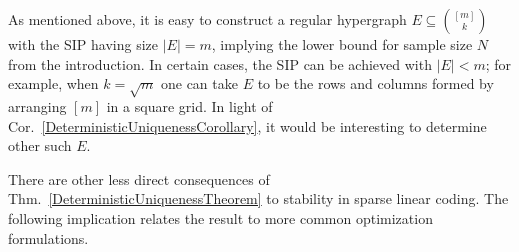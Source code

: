 \documentclass[9pt,twocolumn]{pnas-new}
\newtheorem{proposition}{Proposition}
\begin{document}
As mentioned above, it is easy to construct a regular hypergraph $E \subseteq {[m] \choose k}$ with the SIP having size $|E| = m$, implying the lower bound for sample size $N$ from the introduction. In certain cases, the SIP can be achieved with $|E| < m$; for example, when $k = \sqrt{m}$ one can take $E$ to be the rows and columns formed by arranging $[m]$ in a square grid.  In light of Cor.~\ref{DeterministicUniquenessCorollary}, it would be interesting to determine other such $E$. %

There are other less direct consequences of Thm.~\ref{DeterministicUniquenessTheorem} to stability in sparse linear coding.  The following implication relates the result to more common optimization formulations.
\end{document}
